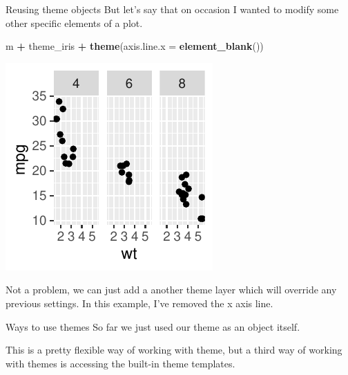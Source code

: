 \documentclass[
  ignorenonframetext,
]{beamer}
\newenvironment{Shaded}{\begin{snugshade}}{\end{snugshade}}
\newcommand{\AttributeTok}[1]{\textcolor[rgb]{0.13,0.29,0.53}{#1}}
\newcommand{\FunctionTok}[1]{\textcolor[rgb]{0.13,0.29,0.53}{\textbf{#1}}}
\newcommand{\NormalTok}[1]{#1}
\newcommand{\SpecialCharTok}[1]{\textcolor[rgb]{0.81,0.36,0.00}{\textbf{#1}}}
\begin{document}
\begin{frame}[fragile]{Reusing theme objects}
\label{reusing-theme-objects-4}
But let's say that on occasion I wanted to modify some other specific
elements of a plot.


\begin{Shaded}
\begin{Highlighting}[]
\NormalTok{m }\SpecialCharTok{+}\NormalTok{ theme\_iris }\SpecialCharTok{+} \FunctionTok{theme}\NormalTok{(}\AttributeTok{axis.line.x =} \FunctionTok{element\_blank}\NormalTok{())}
\end{Highlighting}
\end{Shaded}

\begin{center}\includegraphics[width=0.5\linewidth]{Figs/unnamed-chunk-80-1} \end{center}

Not a problem, we can just add a another theme layer which will override
any previous settings. In this example, I've removed the x axis line.
\end{frame}

\begin{frame}{Ways to use themes}
\label{ways-to-use-themes-1}
So far we just used our theme as an object itself.

This is a pretty flexible way of working with theme, but a third way of
working with themes is accessing the built-in theme templates.
\end{frame}
\end{document}
